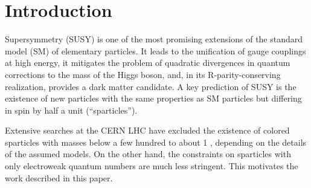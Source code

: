 \section{Introduction}
\label{sect:introduction}

Supersymmetry  (SUSY) \cite{Golfand:1971iw,Wess:1973kz,Wess:1974tw,Fayet1,Fayet2} is one of the most promising extensions of the 
standard model (SM) of elementary particles.  It leads to the unification of gauge couplings at
high energy, it mitigates the problem of quadratic divergences in quantum corrections to the
mass of the Higgs boson, and, in its R-parity-conserving realization, provides a dark matter candidate.
A key prediction of SUSY is the existence of new particles with the same properties as SM particles but
differing in spin by half a unit (``sparticles'').
%

Extensive searches at the CERN LHC have excluded the existence of colored sparticles with masses below a few hundred \GeV to about 1 \TeV,
depending on the details of the assumed models\cite{Chatrchyan:2012sa,Chatrchyan:2012te,Chatrchyan:2012ira,Chatrchyan:2012qka,Chatrchyan:2011ek,Chatrchyan:2012ola,Chatrchyan:2012bba,Chatrchyan:2012mea,Chatrchyan:2013xna,Chatrchyan:2013wxa,Chatrchyan:2013fea,Chatrchyan:2013mys,Khachatryan:2015vra}. %
On the other hand, the constraints on sparticles with only electroweak quantum numbers are much less stringent.  This motivates the
work described in this paper.

